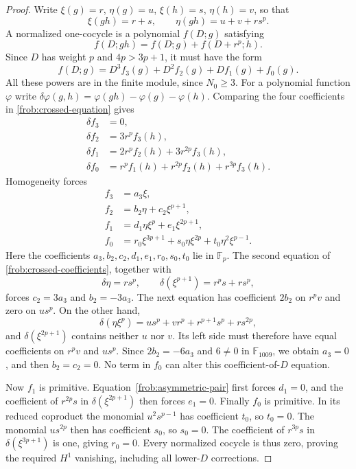 \begin{proof}
Write $\xi(g)=r$, $\eta(g)=u$,
$\xi(h)=s$, $\eta(h)=v$, so that
\[
 \xi(gh)=r+s,\qquad\eta(gh)=u+v+rs^p.
\]
A normalized one-cocycle is a polynomial $f(D;g)$ satisfying
\begin{equation}\label{frob:crossed-equation}
 f(D;gh)=f(D;g)+f(D+r^p;h).
\end{equation}
Since $D$ has weight $p$ and $4p>3p+1$, it must have the form
\[
 f(D;g)=D^3f_3(g)+D^2f_2(g)+Df_1(g)+f_0(g).
\]
All these powers are in the finite module, since $N_0\geq3$.
For a polynomial function $\varphi$ write
$\delta\varphi(g,h)=\varphi(gh)-\varphi(g)-\varphi(h)$.
Comparing the four coefficients in
\eqref{frob:crossed-equation} gives
\begin{align}
 \delta f_3&=0,\nonumber\\
 \delta f_2&=3r^pf_3(h),\nonumber\\
 \delta f_1&=2r^pf_2(h)+3r^{2p}f_3(h),
       \label{frob:crossed-coefficients}\\
 \delta f_0&=r^pf_1(h)+r^{2p}f_2(h)+r^{3p}f_3(h).
       \nonumber
\end{align}
Homogeneity forces
\begin{align*}
 f_3&=a_3\xi,\\
 f_2&=b_2\eta+c_2\xi^{p+1},\\
 f_1&=d_1\eta\xi^p+e_1\xi^{2p+1},\\
 f_0&=r_0\xi^{3p+1}+s_0\eta\xi^{2p}
                       +t_0\eta^2\xi^{p-1}.
\end{align*}
Here the coefficients $a_3,b_2,c_2,d_1,e_1,r_0,s_0,t_0$ lie in $\mathbb F_p$.
The second equation of \eqref{frob:crossed-coefficients}, together
with
\[
 \delta\eta=rs^p,\qquad
 \delta(\xi^{p+1})=r^ps+rs^p,
\]
forces $c_2=3a_3$ and $b_2=-3a_3$.
The next equation has coefficient $2b_2$ on $r^pv$ and zero
on $us^p$.  On the other hand,
\begin{equation}\label{frob:asymmetric-pair}
 \delta(\eta\xi^p)
       =us^p+vr^p+r^{p+1}s^p+rs^{2p},
\end{equation}
and $\delta(\xi^{2p+1})$ contains neither $u$ nor $v$.
Its left side must therefore have equal coefficients on $r^pv$
and $us^p$.  Since $2b_2=-6a_3$ and $6\neq0$ in
$\mathbb F_{1009}$, we obtain $a_3=0$, and then
$b_2=c_2=0$.  No term in $f_0$ can alter this
coefficient-of-$D$ equation.

Now $f_1$ is primitive.  Equation~\eqref{frob:asymmetric-pair}
first forces $d_1=0$, and the coefficient of $r^{2p}s$
in $\delta(\xi^{2p+1})$ then forces $e_1=0$.
Finally $f_0$ is primitive.  In its reduced coproduct the monomial
$u^2s^{p-1}$ has coefficient $t_0$, so $t_0=0$.
The monomial $us^{2p}$ then has coefficient $s_0$, so
$s_0=0$.  The coefficient of $r^{3p}s$ in
$\delta(\xi^{3p+1})$ is one, giving $r_0=0$.
Every normalized cocycle is thus zero, proving the required
$H^1$ vanishing, including all lower-$D$ corrections.


\end{proof}
